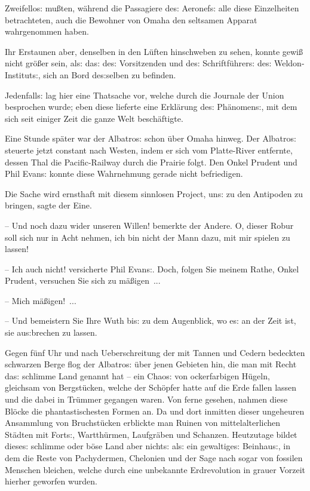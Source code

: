 \documentclass[oneside,12pt]{book}
\newcommand{\s}{s:}
\begin{document}
Zweifello{\s} mu{\ss}ten, w\"ahrend die Passagiere de{\s} Aeronef{\s}
alle diese Einzelheiten betrachteten, auch die Bewohner von Omaha den
seltsamen Apparat wahrgenommen haben.

Ihr Erstaunen aber, denselben in den L\"uften hinschweben zu sehen,
konnte gewi{\ss} nicht gr\"o{\ss}er sein, al{\s} da{\s} de{\s}
Vorsitzenden und de{\s} Schriftf\"uhrer{\s} de{\s}
Weldon-Institut{\s}, sich an Bord de{\s}selben zu befinden.

Jedenfall{\s} lag hier eine Thatsache vor, welche durch die Journale
der Union besprochen wurde; eben diese lieferte eine Erkl\"arung
de{\s} Ph\"anomen{\s}, mit dem sich seit einiger Zeit die ganze Welt
besch\"aftigte.

Eine Stunde sp\"ater war der {\glqq}Albatro{\s}{\grqq} schon \"uber
Omaha hinweg. Der {\glqq}Albatro{\s}{\grqq} steuerte jetzt constant
nach Westen, indem er sich vom Platte-River entfernte, dessen Thal
die Pacific-Railway durch die Prairie folgt. Den Onkel Prudent und
Phil Evan{\s} konnte diese Wahrnehmung gerade nicht befriedigen.

{\glqq}Die Sache wird ernsthaft mit diesem sinnlosen Project, un{\s}
zu den Antipoden zu bringen, sagte der Eine.

-- Und noch dazu wider unseren Willen! bemerkte der Andere. O, dieser
Robur soll sich nur in Acht nehmen, ich bin nicht der Mann dazu, mit
mir spielen zu lassen!

-- Ich auch nicht! versicherte Phil Evan{\s}. Doch, folgen Sie meinem
Rathe, Onkel Prudent, versuchen Sie sich zu m\"a{\ss}igen~...

-- Mich m\"a{\ss}igen!~...

-- Und bemeistern Sie Ihre Wuth bi{\s} zu dem Augenblick, wo e{\s} an
der Zeit ist, sie au{\s}brechen zu lassen.{\grqq}

Gegen f\"unf Uhr und nach Ueberschreitung der mit Tannen und Cedern
bedeckten schwarzen Berge flog der {\glqq}Albatro{\s}{\grqq} \"uber
jenen Gebieten hin, die man mit Recht da{\s} {\glqq}schlimme
Land{\grqq} genannt hat -- ein Chao{\s} von ockerfarbigen H\"ugeln,
gleichsam von Bergst\"ucken, welche der Sch\"opfer hatte auf die Erde
fallen lassen und die dabei in Tr\"ummer gegangen waren. Von ferne
gesehen, nahmen diese Bl\"ocke die phantastischesten Formen an. Da
und dort inmitten dieser ungeheuren Ansammlung von Bruchst\"ucken
erblickte man Ruinen von mittelalterlichen St\"adten mit Fort{\s},
Wartth\"urmen, Laufgr\"aben und Schanzen. Heut\/zutage bildet diese{\s}
{\glqq}schlimme oder b\"ose Land{\grqq} aber nicht{\s} al{\s} ein
gewaltige{\s} Beinhau{\s}, in dem die Reste von Pachydermen,
Chelonien und der Sage nach sogar von fossilen Menschen bleichen,
welche durch eine unbekannte Erdrevolution in grauer Vorzeit hierher
geworfen wurden.
\end{document}
